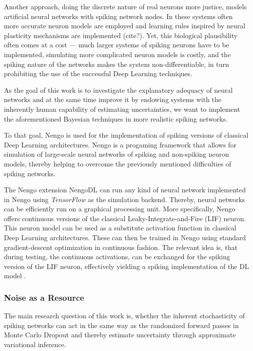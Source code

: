 \documentclass[10pt,a4paper,twocolumn]{article}
\begin{document}
Another approach, doing the discrete nature of real neurons more justice, models artificial neural networks with spiking network nodes. In these systems often more accurate neuron models are employed and learning rules inspired by neural plasticity mechanisms are implemented (cite?). Yet, this biological plausibility often comes at a cost --- much larger systems of spiking neurons have to be implemented, simulating more complicated neuron models is costly, and the spiking nature of the networks makes the system non-differentiable, in turn prohibiting the use of the successful Deep Learning techniques. 

As the goal of this work is to investigate the explanatory adequacy of neural networks and at the same time improve it by endowing systems with the inherently human capability of estimating uncertainties, we want to implement the aforementioned Bayesian techniques in more realistic spiking networks. 

To that goal, Nengo \cite{bekolay2014nengo} is used for the implementation of spiking versions of classical Deep Learning architectures. Nengo is a progaming framework that allows for simulation of large-scale neural networks of spiking and non-spiking neuron models, thereby helping to overcome the previously mentioned difficulties of spiking networks.

The Nengo extension NengoDL can run any kind of neural network implemented in Nengo using \emph{TensorFlow} \cite{abadi2016tensorflow} as the simulation backend. Thereby, neural networks can be efficiently run on a graphical processing unit. More specifically, Nengo offers continuous versions of the classical Leaky-Integrate-and-Fire (LIF) neuron. This neuron model can be used as a substitute activation function in classical Deep Learning architectures. These can then be trained in Nengo using standard gradient-descent optimization in continuous fashion. The relevant idea is, that during testing, the continuous activations, can be exchanged for the spiking version of the LIF neuron, effectively yielding a spiking implementation of the DL model \cite{hunsberger2015spiking}.

\subsubsection{Noise as a Resource}
The main research question of this work is, whether the inherent stochasticity of spiking networks can act in the same way as the randomized forward passes in Monte Carlo Dropout and thereby estimate uncertainty through approximate variational inference. 
\end{document}
